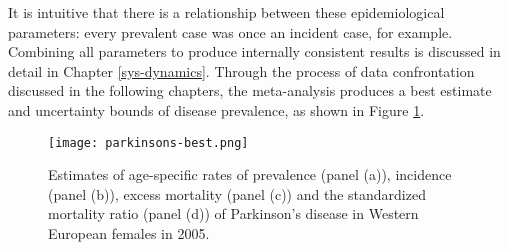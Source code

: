 It is intuitive that there is a relationship between these
epidemiological parameters: every prevalent case was once an incident
case, for example.  Combining all parameters to produce internally
consistent results is discussed in detail in Chapter
\ref{sys-dynamics}.  Through the process of data confrontation
discussed in the following chapters, the meta-analysis produces a best
estimate and uncertainty bounds of disease prevalence, as shown in
Figure \ref{fig:intro-parkinsons fit}.

    \begin{figure}[h]
        \begin{center}
            \texttt{[image: parkinsons-best.png]}
            \caption{Estimates of age-specific rates of
              prevalence (panel (a)), incidence (panel (b)),
              excess mortality (panel (c)) and the
              standardized mortality ratio (panel (d)) of Parkinson's
              disease in Western European females in 2005.}
            \label{fig:intro-parkinsons fit}
        \end{center}
    \end{figure}
